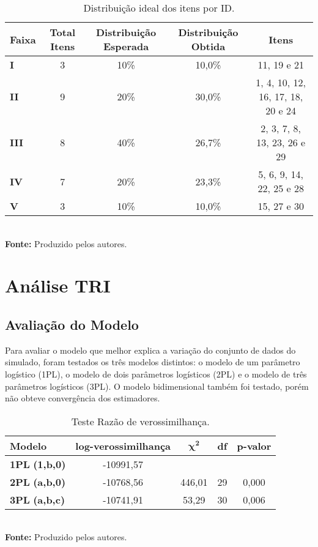 \begin{table}[H]
	\centering
		\caption{Distribuição ideal dos itens por ID.}
		\label{tabela-dificuldade-obtida}
		\begin{tabular}{lcccc}
			\hline
				\textbf{Faixa} & \textbf{Total Itens} &\textbf{ Distribuição Esperada} & \textbf{Distribuição Obtida}  & \textbf{Itens} \\ 
			\hline
			 \textbf{I} & 3 & 10\% &  10,0\% & 11, 19 e 21\\ 
			\hline
			\textbf{II} & 9 & 20\% &  30,0\% & 1, 4, 10, 12, 16, 17, 18, 20 e 24 \\
			\hline
			\textbf{III} & 8 & 40\% & 26,7\% & 2, 3, 7, 8, 13, 23, 26 e 29 \\ 
			\hline
			 \textbf{IV}& 7 & 20\% & 23,3\%  & 5, 6, 9, 14, 22, 25 e 28\\ 
			\hline
			 \textbf{V} & 3 & 10\% & 10,0\% & 15, 27 e 30\\ 
			\hline
		\end{tabular}\\
		\vspace*{0.5cm}
		\small{\textbf{Fonte:} Produzido pelos autores.}
\end{table}



\section{Análise TRI}

\subsection{Avaliação do Modelo}

Para avaliar o modelo que melhor explica a variação do conjunto de dados do simulado, foram testados os três modelos distintos: o modelo de um parâmetro logístico (1PL), o modelo de dois parâmetros logísticos (2PL) e o modelo de três parâmetros logísticos (3PL). O modelo bidimensional também foi testado, porém não obteve convergência dos estimadores. 

\begin{table}[!htb]
	\centering
		\caption{Teste Razão de verossimilhança.}
		\label{tabela-anova}
		\begin{tabular}{lcccc}
			\hline
			\textbf{Modelo} &  \textbf{ log-verossimilhança }& $\boldsymbol{\chi^2}$ & \textbf{df} &\textbf{ p-valor }\\ 
			\hline
			\textbf{1PL} \textbf{(1,b,0)} &  -10991,57 &  &  &  \\ 
			\hline
			\textbf{2PL} \textbf{(a,b,0)} & -10768,56 & 446,01 & 29 & 0,000 \\ 
			\hline
			\textbf{3PL} \textbf{(a,b,c)} & -10741,91 & 53,29 & 30 & 0,006 \\ 
			\hline
		\end{tabular}\\
		\vspace*{0.5cm}
		\small{\textbf{Fonte:} Produzido pelos autores.}
\end{table}



